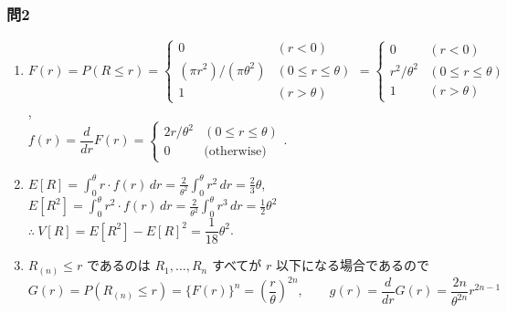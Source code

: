 \documentclass[./main.tex]{subfiles}
\begin{document}
    \subsubsection*{問2}

    \begin{enumerate}
        \item $F(r) = P(R \leq r)
            = \begin{cases}
                0 & (r < 0)\\
                (\pi r^2) / (\pi \theta^2) & (0 \leq r \leq \theta)\\
                1 & (r > \theta)
            \end{cases}
            = \begin{cases}
                0 & (r < 0)\\
                r^2 / \theta^2 & (0 \leq r \leq \theta)\\
                1 & (r > \theta)
            \end{cases}$,\\
        
        $f(r) = \dfrac{d}{dr} F(r)
            = \begin{cases}
                2r/\theta^2 & (0 \leq r \leq \theta )\\
                0 & \text{(otherwise)}
            \end{cases}$.
        
        \item $\displaystyle E[R] = \int_0^\theta r \cdot f(r) \, dr
            = \frac{2}{\theta^2} \int_0^\theta r^2 \, dr
            = \frac{2}{3} \theta$, \quad 
        $\displaystyle E[R^2] = \int_0^\theta r^2 \cdot f(r) \, dr
            = \frac{2}{\theta^2} \int_0^\theta r^3 \, dr
            = \frac{1}{2} \theta^2$\\
        $\therefore \ V[R] = E[R^2] - E[R]^2 = \dfrac{1}{18} \theta^2$.

        \item $R_{(n)} \leq r$ であるのは $R_1, \dots, R_n$ すべてが $r$ 以下になる場合であるので
        \begin{equation*}
            G(r) = P(R_{(n)} \leq r) = \{ F(r) \}^n = \left( \frac{r}{\theta}\right)^{2n}, \qquad
            g(r) = \frac{d}{dr} G(r)
                = \frac{2n}{\theta^{2n}} r^{2n - 1}
        \end{equation*}


\end{enumerate}
\end{document}
